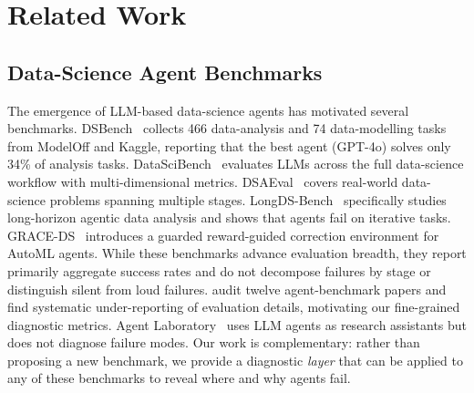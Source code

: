 \section{Related Work}
\label{sec:related}

\subsection{Data-Science Agent Benchmarks}
The emergence of LLM-based data-science agents has motivated several benchmarks. DSBench~\citep{jing2024dsbench} collects 466 data-analysis and 74 data-modelling tasks from ModelOff and Kaggle, reporting that the best agent (GPT-4o) solves only 34\% of analysis tasks. DataSciBench~\citep{zhang2026datascibench} evaluates LLMs across the full data-science workflow with multi-dimensional metrics. DSAEval~\citep{sun2026dsaeval} covers real-world data-science problems spanning multiple stages. LongDS-Bench~\citep{xu2026longdsbench} specifically studies long-horizon agentic data analysis and shows that agents fail on iterative tasks. GRACE-DS~\citep{tsymbalov2026graceds} introduces a guarded reward-guided correction environment for AutoML agents. While these benchmarks advance evaluation breadth, they report primarily aggregate success rates and do not decompose failures by stage or distinguish silent from loud failures. \citet{moghadasi2026what} audit twelve agent-benchmark papers and find systematic under-reporting of evaluation details, motivating our fine-grained diagnostic metrics. Agent Laboratory~\citep{schmidgall2025agent} uses LLM agents as research assistants but does not diagnose failure modes. Our work is complementary: rather than proposing a new benchmark, we provide a diagnostic \emph{layer} that can be applied to any of these benchmarks to reveal where and why agents fail.

